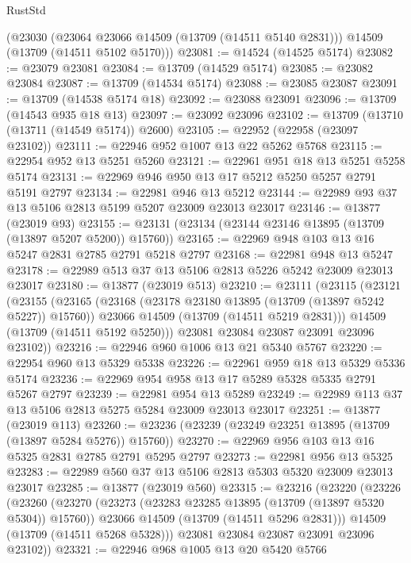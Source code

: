 \begin{lexlean}{RustStd}
\begin{coremodule}
    (@23030
      (@23064 @23066 @14509 (@13709 (@14511 @5140 @2831)))
      @14509
      (@13709 (@14511 @5102 @5170)))
@23081 := @14524 (@14525 @5174)
@23082 := @23079 @23081
@23084 := @13709 (@14529 @5174)
@23085 := @23082 @23084
@23087 := @13709 (@14534 @5174)
@23088 := @23085 @23087
@23091 := @13709 (@14538 @5174 @18)
@23092 := @23088 @23091
@23096 := @13709 (@14543 @935 @18 @13)
@23097 := @23092 @23096
@23102 := @13709 (@13710 (@13711 (@14549 @5174)) @2600)
@23105 := @22952 (@22958 (@23097 @23102))
@23111 := @22946 @952 @1007 @13 @22 @5262 @5768
@23115 := @22954 @952 @13 @5251 @5260
@23121 := @22961 @951 @18 @13 @5251 @5258 @5174
@23131 := @22969 @946 @950 @13 @17 @5212 @5250 @5257 @2791 @5191 @2797
@23134 := @22981 @946 @13 @5212
@23144 := @22989 @93 @37 @13 @5106 @2813 @5199 @5207 @23009 @23013 @23017
@23146 := @13877 (@23019 @93)
@23155 := @23131 (@23134 (@23144 @23146 @13895 (@13709 (@13897 @5207 @5200)) @15760))
@23165 := @22969 @948 @103 @13 @16 @5247 @2831 @2785 @2791 @5218 @2797
@23168 := @22981 @948 @13 @5247
@23178 := @22989 @513 @37 @13 @5106 @2813 @5226 @5242 @23009 @23013 @23017
@23180 := @13877 (@23019 @513)
@23210 := @23111
    (@23115
      (@23121
        (@23155
          (@23165
            (@23168 (@23178 @23180 @13895 (@13709 (@13897 @5242 @5227)) @15760))
            @23066
            @14509
            (@13709 (@14511 @5219 @2831)))
          @14509
          (@13709 (@14511 @5192 @5250)))
        @23081
        @23084
        @23087
        @23091
        @23096
        @23102))
@23216 := @22946 @960 @1006 @13 @21 @5340 @5767
@23220 := @22954 @960 @13 @5329 @5338
@23226 := @22961 @959 @18 @13 @5329 @5336 @5174
@23236 := @22969 @954 @958 @13 @17 @5289 @5328 @5335 @2791 @5267 @2797
@23239 := @22981 @954 @13 @5289
@23249 := @22989 @113 @37 @13 @5106 @2813 @5275 @5284 @23009 @23013 @23017
@23251 := @13877 (@23019 @113)
@23260 := @23236 (@23239 (@23249 @23251 @13895 (@13709 (@13897 @5284 @5276)) @15760))
@23270 := @22969 @956 @103 @13 @16 @5325 @2831 @2785 @2791 @5295 @2797
@23273 := @22981 @956 @13 @5325
@23283 := @22989 @560 @37 @13 @5106 @2813 @5303 @5320 @23009 @23013 @23017
@23285 := @13877 (@23019 @560)
@23315 := @23216
    (@23220
      (@23226
        (@23260
          (@23270
            (@23273 (@23283 @23285 @13895 (@13709 (@13897 @5320 @5304)) @15760))
            @23066
            @14509
            (@13709 (@14511 @5296 @2831)))
          @14509
          (@13709 (@14511 @5268 @5328)))
        @23081
        @23084
        @23087
        @23091
        @23096
        @23102))
@23321 := @22946 @968 @1005 @13 @20 @5420 @5766

\end{coremodule}
\end{lexlean}
